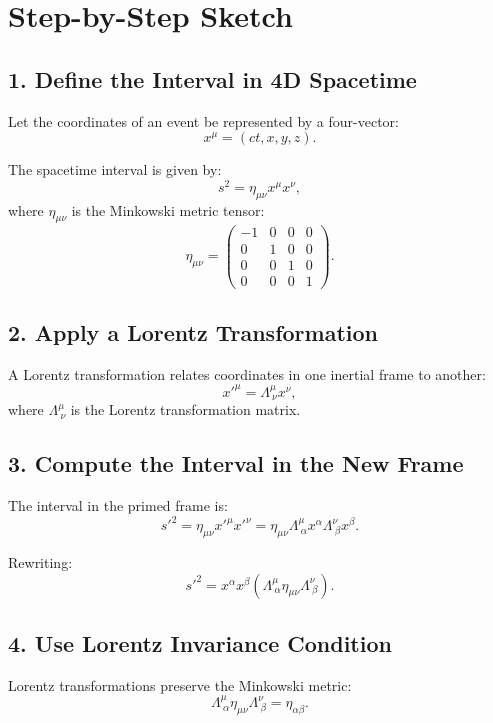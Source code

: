 \documentclass{article}
\begin{document}
	\section*{Step-by-Step Sketch}
	
	\subsection*{1. Define the Interval in 4D Spacetime}
	
	Let the coordinates of an event be represented by a four-vector:
	\[
	x^\mu = (ct, x, y, z).
	\]
	
	The spacetime interval is given by:
	\[
	s^2 = \eta_{\mu\nu} x^\mu x^\nu,
	\]
	where \( \eta_{\mu\nu} \) is the Minkowski metric tensor:
	\[
	\eta_{\mu\nu} = \begin{pmatrix}
		-1 & 0 & 0 & 0 \\
		0 & 1 & 0 & 0 \\
		0 & 0 & 1 & 0 \\
		0 & 0 & 0 & 1
	\end{pmatrix}.
	\]
	
	\subsection*{2. Apply a Lorentz Transformation}
	
	A Lorentz transformation relates coordinates in one inertial frame to another:
	\[
	x'^\mu = \Lambda^\mu_{\ \nu} x^\nu,
	\]
	where \( \Lambda^\mu_{\ \nu} \) is the Lorentz transformation matrix.
	
	\subsection*{3. Compute the Interval in the New Frame}
	
	The interval in the primed frame is:
	\[
	s'^2 = \eta_{\mu\nu} x'^\mu x'^\nu = \eta_{\mu\nu} \Lambda^\mu_{\ \alpha} x^\alpha \Lambda^\nu_{\ \beta} x^\beta.
	\]
	
	Rewriting:
	\[
	s'^2 = x^\alpha x^\beta \left( \Lambda^\mu_{\ \alpha} \eta_{\mu\nu} \Lambda^\nu_{\ \beta} \right).
	\]
	
	\subsection*{4. Use Lorentz Invariance Condition}
	
	Lorentz transformations preserve the Minkowski metric:
	\[
	\Lambda^\mu_{\ \alpha} \eta_{\mu\nu} \Lambda^\nu_{\ \beta} = \eta_{\alpha\beta}.
	\]
	
\end{document}
